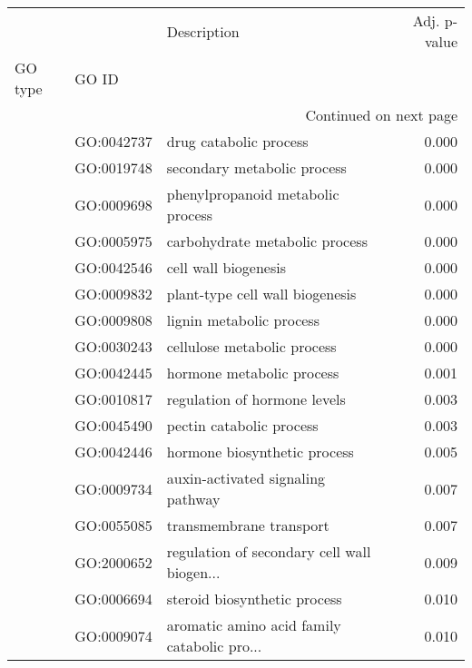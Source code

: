 \begin{longtable}{lllr}
\toprule
   &            &                                  Description &  Adj. p-value \\
GO type & GO ID &                                              &               \\
\midrule
\endhead
\midrule
\multicolumn{4}{r}{{Continued on next page}} \\
\midrule
\endfoot

\bottomrule
\endlastfoot
\multirow{61}{*}{BP} & GO:0042737 &                       drug catabolic process &         0.000 \\
   & GO:0019748 &                  secondary metabolic process &         0.000 \\
   & GO:0009698 &            phenylpropanoid metabolic process &         0.000 \\
   & GO:0005975 &               carbohydrate metabolic process &         0.000 \\
   & GO:0042546 &                         cell wall biogenesis &         0.000 \\
   & GO:0009832 &              plant-type cell wall biogenesis &         0.000 \\
   & GO:0009808 &                     lignin metabolic process &         0.000 \\
   & GO:0030243 &                  cellulose metabolic process &         0.000 \\
   & GO:0042445 &                    hormone metabolic process &         0.001 \\
   & GO:0010817 &                 regulation of hormone levels &         0.003 \\
   & GO:0045490 &                     pectin catabolic process &         0.003 \\
   & GO:0042446 &                 hormone biosynthetic process &         0.005 \\
   & GO:0009734 &            auxin-activated signaling pathway &         0.007 \\
   & GO:0055085 &                      transmembrane transport &         0.007 \\
   & GO:2000652 &  regulation of secondary cell wall biogen... &         0.009 \\
   & GO:0006694 &                 steroid biosynthetic process &         0.010 \\
   & GO:0009074 &  aromatic amino acid family catabolic pro... &         0.010 \\

\end{longtable}
